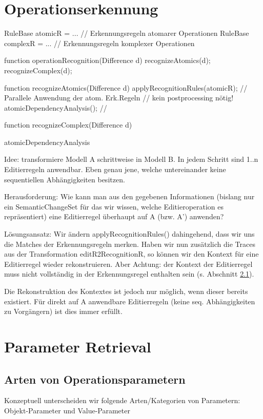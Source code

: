 \section{Operationserkennung}

RuleBase atomicR = ...   // Erkennungsregeln atomarer Operationen
RuleBase complexR = ...  // Erkennungsregeln komplexer Operationen

function operationRecognition(Difference d){
  recognizeAtomics(d);
  recognizeComplex(d);
}

function recognizeAtomics(Difference d){  
  applyRecognitionRules(atomicR); // Parallele Anwendung der atom. Erk.Regeln
  // kein postprocessing nötig!
  atomicDependencyAnalysis(); // 
}

function recognizeComplex(Difference d){

}


atomicDependencyAnalysis

Idee: transformiere Modell A schrittweise in Modell B. In jedem
Schritt sind 1..n Editierregeln anwendbar. Eben genau jene,
welche untereinander keine sequentiellen Abhängigkeiten 
besitzen.

Herausforderung: Wie kann man aus den gegebenen Informationen
(bislang nur ein SemanticChangeSet für das wir wissen, welche
Editieroperation es repräsentiert) eine Editierregel überhaupt
auf A (bzw. A') anwenden? 

Lösungsansatz: Wir ändern applyRecognitionRules() dahingehend,
dass wir uns die Matches der Erkennungsregeln merken. Haben
wir nun zusätzlich die Traces aus der Transformation editR2RecognitionR,
so können wir den Kontext für eine Editierregel wieder
rekonstruieren. Aber Achtung: der Kontext der Editierregel
muss nicht vollständig in der Erkennungsregel enthalten
sein (s. Abschnitt \ref{}).

Die Rekonstruktion des Kontextes ist jedoch nur möglich,
wenn dieser bereits existiert. Für direkt auf A anwendbare
Editierregeln (keine seq. Abhängigkeiten zu Vorgängern) ist
dies immer erfüllt.


\section{Parameter Retrieval}

\subsection{Arten von Operationsparametern}
Konzeptuell unterscheiden wir folgende Arten/Kategorien von Parametern: Objekt-Parameter und Value-Parameter


